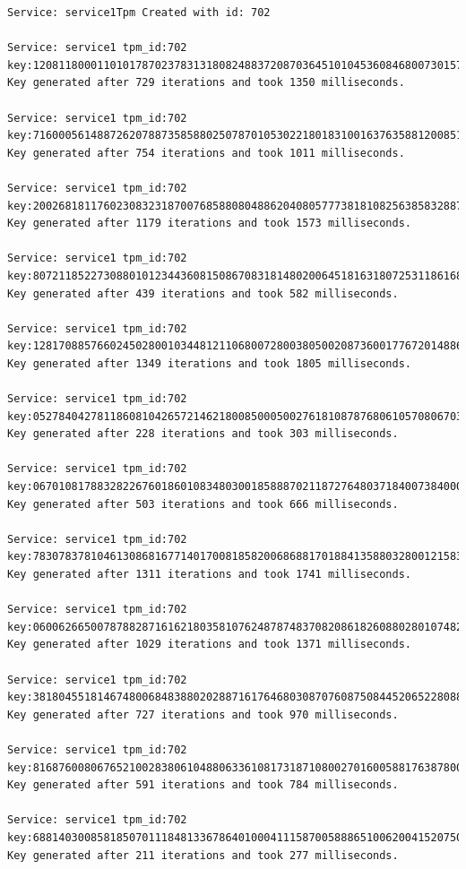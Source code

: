 \begin{lstlisting}
Service: service1Tpm Created with id: 702

Service: service1 tpm_id:702 key:120811800011010178702378313180824883720870364510104536084680073015781700
Key generated after 729 iterations and took 1350 milliseconds.

Service: service1 tpm_id:702 key:716000561488726207887358588025078701053022180183100163763588120085187605
Key generated after 754 iterations and took 1011 milliseconds.

Service: service1 tpm_id:702 key:200268181176023083231870076858808048862040805777381810825638583288780080
Key generated after 1179 iterations and took 1573 milliseconds.

Service: service1 tpm_id:702 key:807211852273088010123443608150867083181480200645181631807253118616808110
Key generated after 439 iterations and took 582 milliseconds.

Service: service1 tpm_id:702 key:128170885766024502800103448121106800728003805002087360017767201488625782
Key generated after 1349 iterations and took 1805 milliseconds.

Service: service1 tpm_id:702 key:052784042781186081042657214621800850005002761810878768061057080670346023
Key generated after 228 iterations and took 303 milliseconds.

Service: service1 tpm_id:702 key:067010817883282267601860108348030018588870211872764803718400738400010533
Key generated after 503 iterations and took 666 milliseconds.

Service: service1 tpm_id:702 key:783078378104613086816771401700818582006868817018841358803280012158381870
Key generated after 1311 iterations and took 1741 milliseconds.

Service: service1 tpm_id:702 key:060062665007878828716162180358107624878748370820861826088028010748217341
Key generated after 1029 iterations and took 1371 milliseconds.

Service: service1 tpm_id:702 key:381804551814674800684838802028871617646803087076087508445206522808800300
Key generated after 727 iterations and took 970 milliseconds.

Service: service1 tpm_id:702 key:816876008067652100283806104880633610817318710800270160058817638780016740
Key generated after 591 iterations and took 784 milliseconds.

Service: service1 tpm_id:702 key:688140300858185070111848133678640100041115870058886510062004152075081203
Key generated after 211 iterations and took 277 milliseconds.


\end{lstlisting}
